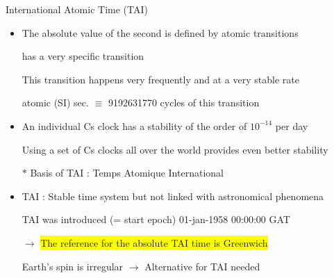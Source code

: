 \Tr
\begin{center}
{\red International Atomic Time (TAI)}
\end{center}
%
\begin{itemize}
\item The absolute value of the second is defined by atomic transitions
\item[]  has a very specific transition
\item[] This transition happens very frequently and at a very stable rate
\item[] { atomic (SI) sec. $\equiv$ 9192631770 cycles of this  transition}
\item An individual Cs clock has a stability of the order of $10^{-14}$ per day
\item[] Using a set of Cs clocks all over the world provides even better stability 
\item[$\ast$] Basis of {\blue TAI : Temps Atomique International}
\item TAI : Stable time system but not linked with astronomical phenomena
\item[] TAI was introduced (= start epoch) 01-jan-1958 00:00:00 GAT
\item[] $\rightarrow$ \colorbox{yellow}{The reference for the absolute TAI time is Greenwich}
\item[] Earth's spin is irregular $\rightarrow$ Alternative for TAI needed
\end{itemize}

